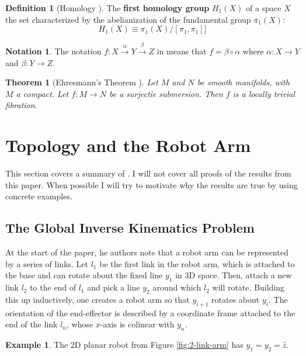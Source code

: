\documentclass[12pt]{article}
\newtheorem{thm}{Theorem}
\theoremstyle{definition}
\newtheorem{defn}{Definition}
\newtheorem{example}{Example}
\newtheorem*{notation}{Notation}
\begin{document}
\begin{defn}[Homology \cite{topology-fiber-bundles}]
    The \textbf{first homology group} \(H_1(X)\) of a space \(X\) the set
    characterized by the  abelianization of the fundamental group \(\pi_1(X)\):
    \[
        H_1(X) \equiv \pi_1(X)/[\pi_1,\pi_1]]
    \]
\end{defn}

\begin{notation}
    The notation
    \(f : X \xrightarrow{\alpha} Y \xrightarrow{\beta} Z\)
    in \cite{topology-robot-arm} means that \(f = \beta \circ \alpha\) where
    \(\alpha : X \rightarrow Y\) and \(\beta : Y \rightarrow Z\).
\end{notation}

\begin{thm}[Ehresmann's Theorem \cite{ehresmann}]
    Let \(M\) and \(N\) be smooth manifolds, with \(M\) a compact. 
    Let \(f : M \rightarrow N\) be a surjectie submersion. Then \(f\) is a
    locally trivial fibration.
\end{thm}

\section{Topology and the Robot Arm}
This section covers a summary of \cite{topology-robot-arm}. I will not cover
all proofs of the results from this paper. When possible I
will try to motivate why the results are true by using concrete examples.

\subsection{The Global Inverse Kinematics Problem}
At the start of the paper, he authors note that a robot arm can be represented
by a series of links. Let \(l_1\) be the first link in the robot arm, which is
attached to the base and can rotate about the fixed line \(y_1\) in 3D space.
Then, attach a new link \(l_2\) to the end of \(l_1\) and pick a line \(y_2\)
around which \(l_2\) will rotate. Building this up inductively, one creates a
robot arm so that \(y_{i+1}\) rotates about \(y_i\). The orientation of the
end-effector is described by a coordinate frame attached to the end of the link
\(l_n\), whose \(x\)-axis is colinear with \(y_n\).

\begin{example}
    The 2D planar robot from Figure \ref{fig:2-link-arm} has 
    \(y_1 = y_2 = \hat{z}\).
\end{example}
\end{document}
